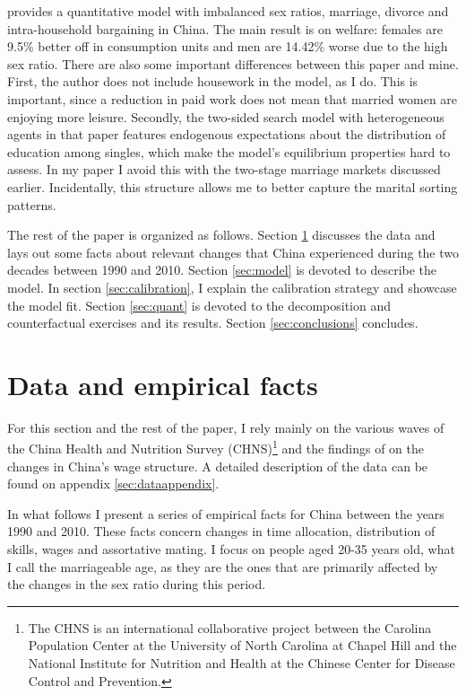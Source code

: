 \documentclass[12pt]{article}
\begin{document}
\cite{wang18} provides a quantitative model with imbalanced sex ratios, marriage, divorce and intra-household bargaining in China. The main result is on welfare: females are 9.5\% better off in consumption units and men are 14.42\% worse due to the high sex ratio. There are also some important differences between this paper and mine. First, the author does not include housework in the model, as I do. This is important, since a reduction in paid work does not mean that married women are enjoying more leisure. Secondly, the two-sided search model with heterogeneous agents in that paper features endogenous expectations about the distribution of education among singles, which make the model's equilibrium properties hard to assess. In my paper I avoid this with the two-stage marriage markets discussed earlier. Incidentally, this structure allows me to better capture the marital sorting patterns.

The rest of the paper is organized as follows. Section \ref{sec:dataandfacts} discusses the data and lays out some facts about relevant changes that China experienced during the two decades between 1990 and 2010. Section \ref{sec:model} is devoted to describe the model. In section \ref{sec:calibration}, I explain the calibration strategy and showcase the model fit. Section \ref{sec:quant} is devoted to the decomposition and counterfactual exercises and its results. Section \ref{sec:conclusions} concludes.    

\section{Data and empirical facts} \label{sec:dataandfacts}

For this section and the rest of the paper, I rely mainly on the various waves of the China Health and Nutrition Survey (CHNS)\footnote{The CHNS is an international collaborative project between the Carolina Population Center at the University of  North Carolina at Chapel Hill and the National Institute for Nutrition and Health at the Chinese Center for Disease Control and Prevention.} and the findings of \cite{getao14} on the changes in China's wage structure. A detailed description of the data can be found on appendix \ref{sec:dataappendix}.

In what follows I present a series of empirical facts for China between the years 1990 and 2010. These facts concern changes in time allocation, distribution of skills, wages and assortative mating. I focus on people aged 20-35 years old, what I call the marriageable age, as they are the ones that are primarily affected by the changes in the sex ratio during this period.   
\end{document}
